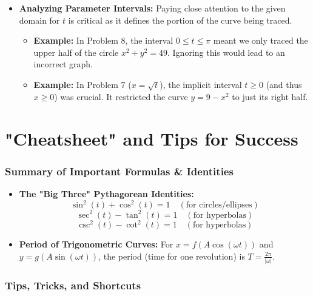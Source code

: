 \documentclass{article}
\begin{document}
\begin{itemize}
    \item \textbf{Analyzing Parameter Intervals:} Paying close attention to the given domain for $t$ is critical as it defines the portion of the curve being traced.
        \begin{itemize}
            \item \textbf{Example:} In Problem 8, the interval $0 \le t \le \pi$ meant we only traced the upper half of the circle $x^2+y^2=49$. Ignoring this would lead to an incorrect graph.
            \item \textbf{Example:} In Problem 7 ($x=\sqrt{t}$), the implicit interval $t \ge 0$ (and thus $x \ge 0$) was crucial. It restricted the curve $y=9-x^2$ to just its right half.
        \end{itemize}
\end{itemize}

\part*{"Cheatsheet" and Tips for Success}

\section{Summary of Important Formulas \& Identities}

\begin{itemize}
    \item \textbf{The "Big Three" Pythagorean Identities:}
    \[ \sin^2(t) + \cos^2(t) = 1 \quad (\text{for circles/ellipses}) \]
    \[ \sec^2(t) - \tan^2(t) = 1 \quad (\text{for hyperbolas}) \]
    \[ \csc^2(t) - \cot^2(t) = 1 \quad (\text{for hyperbolas}) \]
    \item \textbf{Period of Trigonometric Curves:} For $x=f(A\cos(\omega t))$ and $y=g(A\sin(\omega t))$, the period (time for one revolution) is $T = \frac{2\pi}{|\omega|}$.
\end{itemize}

\section{Tips, Tricks, and Shortcuts}
\end{document}
